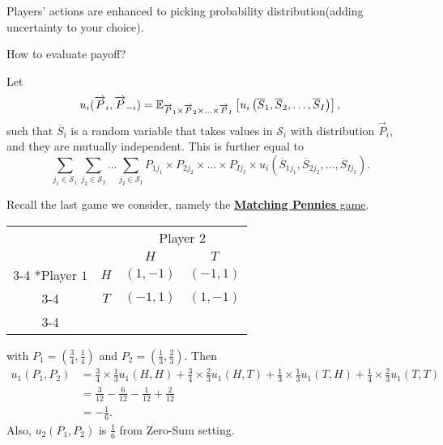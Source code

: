 \hr

Players' actions are enhanced to picking probability distribution(adding uncertainty to your choice).

\begin{problem}
How to evaluate payoff?
\end{problem}
\begin{answer}
	Let
	\[
		u_{i}(\overrightarrow{P}_i, \overrightarrow{P}_{-i}) = \mathbb{\MakeUppercase{E}}_{\overrightarrow{P}_{1}\times \overrightarrow{P}_2 \times \ldots \times \overrightarrow{P}_I}\left[ u_{i}\left(\overline{S}_1, \overline{S}_2, \ldots , \overline{S}_I\right) \right],
	\]
	such that \(\overline{S}_i\) is a random variable that takes values in \(\mathcal{S}_i\) with distribution \(\overrightarrow{P}_i\), and they are mutually independent. This is further equal to
	\[
		\sum\limits_{j_1\in \mathcal{S}_1 }\sum\limits_{j_2\in \mathcal{S}_2}\ldots \sum\limits_{j_I\in \mathcal{S}_I }P_{1j_1}\times P_{2j_2}\times \ldots \times P_{Ij_I}\times u_{i}\left(\overline{S}_{1j_1}, \overline{S}_{2j_2}, \ldots , \overline{S}_{Ij_I}\right).
	\]
\end{answer}
\begin{eg}
	Recall the last game we consider, namely the \hyperref[matching-pennies]{\textbf{Matching Pennies} game}.
	\begin{table}[H]
		\centering
		\setlength{\extrarowheight}{2pt}
		\begin{tabular}{cc|c|c|}
			                          & \multicolumn{1}{c}{} & \multicolumn{2}{c}{Player $2$}                           \\
			                          & \multicolumn{1}{c}{} & \multicolumn{1}{c}{$H$}        & \multicolumn{1}{c}{$T$} \\\cline{3-4}
			\multirow{2}*{Player $1$} & $H$                  & $(1, -1)$                      & $(-1, 1)$               \\\cline{3-4}
			                          & $T$                  & $(-1, 1)$                      & $(1, -1)$               \\\cline{3-4}
		\end{tabular}
	\end{table}
	with \(P_1 = (\frac{3}{4}, \frac{1}{4})\) and \(P_2 = (\frac{1}{3}, \frac{2}{3})\). Then
	\[
		\begin{split}
			u_1(P_1, P_2) &= \frac{3}{4}\times \frac{1}{3} u_1(H, H) + \frac{3}{4}\times \frac{2}{3}u_1(H, T) + \frac{1}{3}\times \frac{1}{3}u_1(T, H)+\frac{1}{4}\times \frac{2}{3}u_1(T, T)\\
			&= \frac{3}{12} - \frac{6}{12} - \frac{1}{12} + \frac{2}{12}\\
			&= -\frac{1}{6}.
		\end{split}
	\]
	Also, \(u_2(P_1, P_2)\) is \(\frac{1}{6}\) from Zero-Sum setting.
\end{eg}

